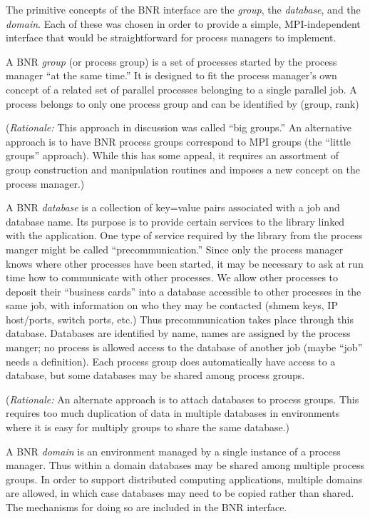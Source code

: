 \documentclass{article}
\begin{document}
The primitive concepts of the BNR interface are the {\em group}, the {\em
  database},
and the {\em domain}.  Each of these was chosen in order to
provide a simple, MPI-independent interface that would be straightforward for
process managers to implement.

A BNR {\em group\/} (or process group) is a set of processes started by the
process manager ``at the same time.''  It is designed to fit the process
manager's own concept of a related set of parallel processes belonging to a
single parallel job.  A process belongs to only one process group and can be
identified by (group, rank) 

({\em Rationale:\/}  This approach in discussion was called ``big groups.''
An alternative approach is to have BNR process groups correspond to MPI groups
(the ``little groups'' approach).  While this has some appeal, it requires an
assortment of group construction and manipulation routines and imposes a new
concept on the process manager.)

A BNR {\em database\/} is a collection of key=value pairs associated with a
job and database name.  Its purpose is to provide certain services to the
library linked with the application.
One type of service required by the library from the process manger might be
called ``precommunication.''  Since only the process manager knows where other
processes have been started, it may be necessary to ask at run time how to
communicate with other processes.  We allow other processes to deposit their
``business cards'' into a database accessible to other processes in the same
job, with information on who they may be contacted (shmem keys, IP host/ports,
switch ports, etc.)  Thus precommunication takes place through this database.
Databases are identified by name, names are assigned by the process manger;
no process is allowed access to the database of another job (maybe ``job''
needs a definition).  Each process group does automatically have access to a
database, but some databases may be shared among process groups.

({\em Rationale:\/}  An alternate approach is to attach databases to process
groups.  This requires too much duplication of data in multiple databases in
environments where it is easy for multiply groups to share the same database.)

A BNR {\em domain\/} is an environment managed by a single instance of a
process manager.  Thus within a domain databases may be shared among multiple
process groups.  In order to support distributed computing applications,
multiple domains are allowed, in which case databases may need to be copied
rather than shared.  The mechanisms for doing so are included in the BNR
interface. 
\end{document}
